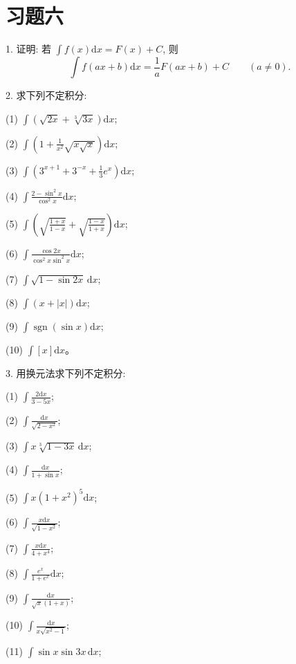\documentclass[UTF8, 12pt, fontset=fandol, oneside]{ctexart}
\begin{document}
\section*{习题六}

1. 证明: 若 $\displaystyle \int f(x)\mathrm dx=F(x)+C$, 则
\[
  \int f(ax+b)\mathrm dx=\frac1aF(ax+b)+C\qquad(a\ne0).
\]

2. 求下列不定积分:

(1) $\displaystyle \int\left(\sqrt{2x}+\sqrt[3]{3x}\right)\mathrm dx$;

(2) $\displaystyle \int\left(1+\frac1{x^2}\sqrt{x\sqrt x}\right)\mathrm dx$;

(3) $\displaystyle \int\left(3^{x+1}+3^{-x}+\frac13e^x\right)\mathrm dx$;

(4) $\displaystyle \int\frac{2-\sin^2x}{\cos^2x}\mathrm dx$;

(5) $\displaystyle \int\left(\sqrt{\frac{1+x}{1-x}}+\sqrt{\frac{1-x}{1+x}}\right)\mathrm dx$;

(6) $\displaystyle \int\frac{\cos2x}{\cos^2x\sin^2x}\mathrm dx$;

(7) $\displaystyle \int\sqrt{1-\sin2x}\,\mathrm dx$;

(8) $\displaystyle \int(x+|x|)\mathrm dx$;

(9) $\displaystyle \int\operatorname{sgn}(\sin x)\mathrm dx$;

(10) $\displaystyle \int[x]\mathrm dx$。

3. 用换元法求下列不定积分:

(1) $\displaystyle \int\frac{2\mathrm dx}{3-5x}$;

(2) $\displaystyle \int\frac{\mathrm dx}{\sqrt{2-x^2}}$;

(3) $\displaystyle \int x\sqrt[3]{1-3x}\,\mathrm dx$;

(4) $\displaystyle \int\frac{\mathrm dx}{1+\sin x}$;

(5) $\displaystyle \int x(1+x^2)^5\mathrm dx$;

(6) $\displaystyle \int\frac{x\mathrm dx}{\sqrt{1-x^2}}$;

(7) $\displaystyle \int\frac{x\mathrm dx}{4+x^4}$;

(8) $\displaystyle \int\frac{e^x}{1+e^x}\mathrm dx$;

(9) $\displaystyle \int\frac{\mathrm dx}{\sqrt x(1+x)}$;

(10) $\displaystyle \int\frac{\mathrm dx}{x\sqrt{x^2-1}}$;

(11) $\displaystyle \int\sin x\sin3x\,\mathrm dx$;
\end{document}
